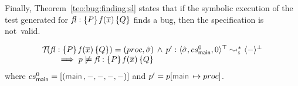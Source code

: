Finally, Theorem~\ref{teo:bug:finding:sl} states that if the symbolic execution of the 
test generated for ${\mathit{fl}} : \{ P \} \, \mathit{f}(\overline{x}) \, \{ Q \}$ finds a bug, then the specification 
is not~valid.

\begin{theorem}\label{teo:bug:finding:sl}
$$
\begin{array}{l}
\testify{}(\specsig{\pass}{\pid(\jvec{x})}{\qass}{\flag})  = (\proc, \sstate) \, \wedge \, 
  \prog' :  \transabssemrule{\sstate, \csmain, 0}{-}{\top}{\bot}{\symbolic} \\ \quad \quad 
    \implies  
         \prog \not\satisfies \specsig{\pass}{\pid(\jvec{x})}{\qass}{\flag}
\end{array}
$$
\noindent where  $\csmain = [ (\jsilmain, -, -, -, -) ]$ 
and $\prog' = \prog[\jsilmain \mapsto \proc]$.
\end{theorem}



